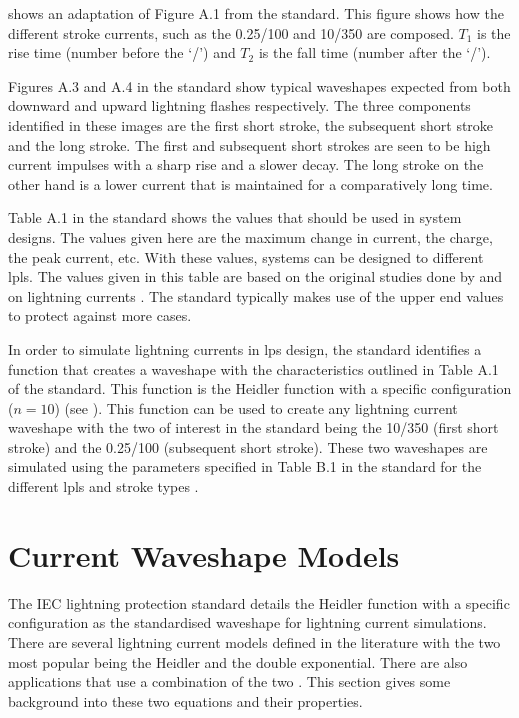  shows an adaptation of Figure A.1 from the standard. This figure shows how the different stroke currents, such as the 0.25/100 and 10/350 are composed. $T_1$ is the rise time (number before the `/') and $T_2$ is the fall time (number after the `/').

Figures A.3 and A.4 in the standard show typical waveshapes expected from both downward and upward lightning flashes respectively. The three components identified in these images are the first short stroke, the subsequent short stroke and the long stroke. The first and subsequent short strokes are seen to be high current impulses with a sharp rise and a slower decay. The long stroke on the other hand is a lower current that is maintained for a comparatively long time.

Table A.1 in the standard shows the values that should be used in system designs. The values given here are the maximum change in current, the charge, the peak current, etc. With these values, systems can be designed to different \glspl{lpl}. The values given in this table are based on the original studies done by \citeauthor{Anderson1980} and \citeauthor{Berger1975} on lightning currents \cite{Anderson1980,Berger1975}. The standard typically makes use of the upper end values to protect against more cases.

In order to simulate lightning currents in \gls{lps} design, the standard identifies a function that creates a waveshape with the characteristics outlined in Table A.1 of the standard. This function is the Heidler function with a specific configuration ($n = 10$) (see ). This function can be used to create any lightning current waveshape with the two of interest in the standard being the 10/350 (first short stroke) and the 0.25/100 (subsequent short stroke). These two waveshapes are simulated using the parameters specified in Table B.1 in the standard for the different \glspl{lpl} and stroke types \cite{IEC623051}.


\section{Current Waveshape Models}
\label{sec:background_current_waveshape_models}
The IEC lightning protection standard details the Heidler function with a specific configuration as the standardised waveshape for lightning current simulations. There are several lightning current models defined in the literature with the two most popular being the Heidler and the double exponential. There are also applications that use a combination of the two \cite{Javor2011,Nucci2003,Pavanello2007}. This section gives some background into these two equations and their properties.


